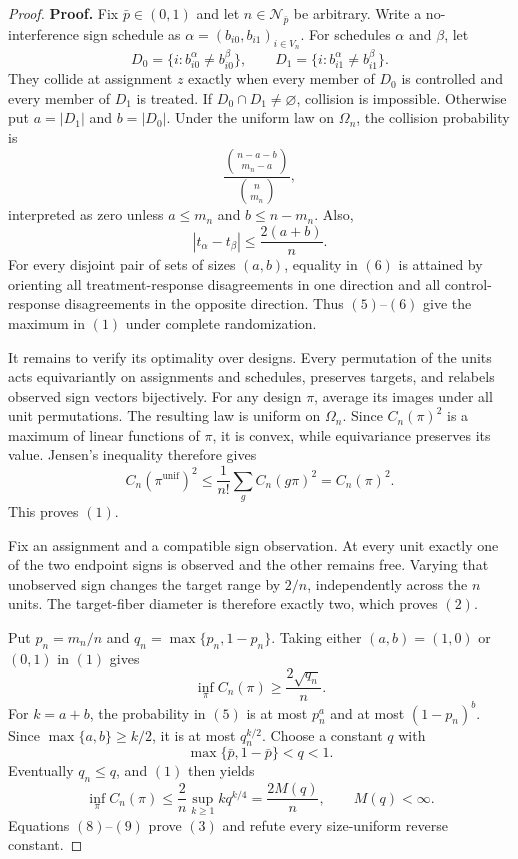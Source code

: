 \documentclass{article}
\begin{document}
\begin{proof}
\textbf{Proof.}
Fix \(\bar p\in(0,1)\) and let \(n\in\mathcal N_{\bar p}\) be arbitrary. Write a no-interference sign schedule as \(\alpha=(b_{i0},b_{i1})_{i\in V_n}\). For schedules \(\alpha\) and \(\beta\), let
\[
 D_0=\{i:b_{i0}^\alpha\ne b_{i0}^\beta\},
 \qquad
 D_1=\{i:b_{i1}^\alpha\ne b_{i1}^\beta\}. \tag{4}
\]
They collide at assignment \(z\) exactly when every member of \(D_0\) is controlled and every member of \(D_1\) is treated. If \(D_0\cap D_1\ne\varnothing\), collision is impossible. Otherwise put \(a=|D_1|\) and \(b=|D_0|\). Under the uniform law on \(\Omega_n\), the collision probability is
\[
 \frac{\binom{n-a-b}{m_n-a}}{\binom n{m_n}}, \tag{5}
\]
interpreted as zero unless \(a\le m_n\) and \(b\le n-m_n\). Also,
\[
 |t_\alpha-t_\beta|
 \le\frac{2(a+b)}n. \tag{6}
\]
For every disjoint pair of sets of sizes \((a,b)\), equality in \((6)\) is attained by orienting all treatment-response disagreements in one direction and all control-response disagreements in the opposite direction. Thus \((5)\)--\((6)\) give the maximum in \((1)\) under complete randomization.

It remains to verify its optimality over designs. Every permutation of the units acts equivariantly on assignments and schedules, preserves targets, and relabels observed sign vectors bijectively. For any design \(\pi\), average its images under all unit permutations. The resulting law is uniform on \(\Omega_n\). Since \(C_n(\pi)^2\) is a maximum of linear functions of \(\pi\), it is convex, while equivariance preserves its value. Jensen's inequality therefore gives
\[
 C_n(\pi^{\mathrm{unif}})^2
 \le \frac1{n!}\sum_g C_n(g\pi)^2
 =C_n(\pi)^2. \tag{7}
\]
This proves \((1)\).

Fix an assignment and a compatible sign observation. At every unit exactly one of the two endpoint signs is observed and the other remains free. Varying that unobserved sign changes the target range by \(2/n\), independently across the \(n\) units. The target-fiber diameter is therefore exactly two, which proves \((2)\).

Put \(p_n=m_n/n\) and \(q_n=\max\{p_n,1-p_n\}\). Taking either \((a,b)=(1,0)\) or \((0,1)\) in \((1)\) gives
\[
 \inf_\pi C_n(\pi)\ge\frac{2\sqrt{q_n}}n. \tag{8}
\]
For \(k=a+b\), the probability in \((5)\) is at most \(p_n^a\) and at most \((1-p_n)^b\). Since \(\max\{a,b\}\ge k/2\), it is at most \(q_n^{k/2}\). Choose a constant \(q\) with
\[
 \max\{\bar p,1-\bar p\}<q<1.
\]
Eventually \(q_n\le q\), and \((1)\) then yields
\[
 \inf_\pi C_n(\pi)
 \le\frac2n\sup_{k\ge1}kq^{k/4}
 =\frac{2M(q)}n,
 \qquad M(q)<\infty. \tag{9}
\]
Equations \((8)\)--\((9)\) prove \((3)\) and refute every size-uniform reverse constant.


\end{proof}
\end{document}
